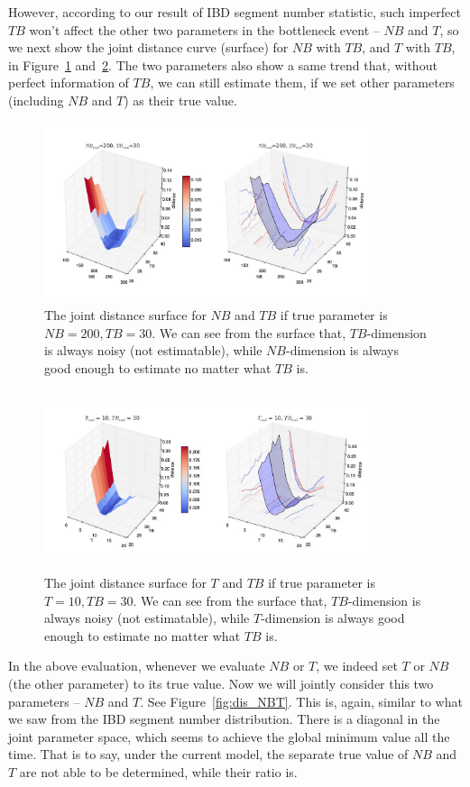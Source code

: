 \documentclass{bioinfo}
\begin{document}
However, according to our result of IBD segment number statistic, such imperfect $TB$ won't affect the other two parameters in the bottleneck event -- $NB$ and $T$, so we next show the joint distance curve (surface) for $NB$ with $TB$, and $T$ with $TB$, in Figure~\ref{fig:dis_NBTB} and~\ref{fig:dis_TBT}. The two parameters also show a same trend that, without perfect information of $TB$, we can still estimate them, if we set other parameters (including $NB$ and $T$) as their true value.

\begin{figure}[h]
\centerline{\includegraphics[width=270pt, height=150pt]{like_NBTB.jpg}}
\caption{The joint distance surface for $NB$ and $TB$ if true parameter is $NB=200,TB=30$. We can see from the surface that, $TB$-dimension is always noisy (not estimatable), while $NB$-dimension is always good enough to estimate no matter what $TB$ is.}\label{fig:dis_NBTB}
\end{figure}

\begin{figure}[h]
\centerline{\includegraphics[width=270pt, height=150pt]{like_TBT.jpg}}
\caption{The joint distance surface for $T$ and $TB$ if true parameter is $T=10,TB=30$. We can see from the surface that, $TB$-dimension is always noisy (not estimatable), while $T$-dimension is always good enough to estimate no matter what $TB$ is.}\label{fig:dis_TBT}
\end{figure}

In the above evaluation, whenever we evaluate $NB$ or $T$, we indeed set $T$ or $NB$ (the other parameter) to its true value. Now we will jointly consider this two parameters -- $NB$ and $T$. See Figure~\ref{fig:dis_NBT}. This is, again, similar to what we saw from the IBD segment number distribution. There is a diagonal in the joint parameter space, which seems to achieve the global minimum value all the time. That is to say, under the current model, the separate true value of $NB$ and $T$ are not able to be determined, while their ratio is.
\end{document}
